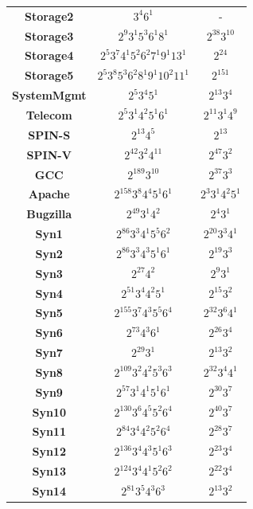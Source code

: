 \documentclass[conference]{IEEEtran}
\theoremstyle{definition}
\begin{document}
\begin{table}[!ht]
\begin{tabular}{|c|c|c|}
    \textbf{Storage2} & $3^{4}6^{1}$ & - \\
    \textbf{Storage3} & $2^{9}3^{1}5^{3}6^{1}8^{1}$ & $2^{38}3^{10}$ \\
    \textbf{Storage4} & $2^{5}3^{7}4^{1}5^{2}6^{2}7^{1}9^{1}13^{1}$ & $2^{24}$ \\
    \textbf{Storage5} & $2^{5}3^{8}5^{3}6^{2}8^{1}9^{1}10^{2}11^{1}$ & $2^{151}$ \\
    \textbf{SystemMgmt} & $2^{5}3^{4}5^{1}$ & $2^{13}3^{4}$ \\
    \textbf{Telecom} & $2^{5}3^{1}4^{2}5^{1}6^{1}$ & $2^{11}3^{1}4^{9}$ \\
    \textbf{SPIN-S} & $2^{13}4^{5}$ & $2^{13}$ \\
    \textbf{SPIN-V} & $2^{42}3^{2}4^{11}$ & $2^{47}3^{2}$ \\
    \textbf{GCC} & $2^{189}3^{10}$ & $2^{37}3^{3}$ \\
    \textbf{Apache} & $2^{158}3^{8}4^{4}5^{1}6^{1}$ & $2^{3}3^{1}4^{2}5^{1}$  \\
    \textbf{Bugzilla} & $2^{49}3^{1}4^{2}$ & $2^{4}3^{1}$ \\
    \textbf{Syn1} & $2^{86}3^{3}4^{1}5^{5}6^{2}$ & $2^{20}3^{3}4^{1}$ \\
    \textbf{Syn2} & $2^{86}3^{3}4^{3}5^{1}6^{1}$ & $2^{19}3^{3}$ \\
    \textbf{Syn3} & $2^{27}4^{2}$ & $2^{9}3^{1}$ \\
    \textbf{Syn4} & $2^{51}3^{4}4^{2}5^{1}$ & $2^{15}3^{2}$ \\
    \textbf{Syn5} & $2^{155}3^{7}4^{3}5^{5}6^{4}$ & $2^{32}3^{6}4^{1}$\\
    \textbf{Syn6} & $2^{73}4^{3}6^{1}$ & $2^{26}3^{4}$ \\
    \textbf{Syn7} & $2^{29}3^{1}$ & $2^{13}3^{2}$ \\
    \textbf{Syn8} & $2^{109}3^{2}4^{2}5^{3}6^{3}$ & $2^{32}3^{4}4^{1}$ \\
    \textbf{Syn9} & $2^{57}3^{1}4^{1}5^{1}6^{1}$ & $2^{30}3^{7}$ \\
    \textbf{Syn10} & $2^{130}3^{6}4^{5}5^{2}6^{4}$ & $2^{40}3^{7}$ \\
    \textbf{Syn11} & $2^{84}3^{4}4^{2}5^{2}6^{4}$ & $2^{28}3^{7}$\\
    \textbf{Syn12} & $2^{136}3^{4}4^{3}5^{1}6^{3}$ & $2^{23}3^{4}$ \\
    \textbf{Syn13} & $2^{124}3^{4}4^{1}5^{2}6^{2}$ & $2^{22}3^{4}$ \\
    \textbf{Syn14} & $2^{81}3^{5}4^{3}6^{3}$ & $2^{13}3^{2}$ \\

\end{tabular}
\end{table}
\end{document}
